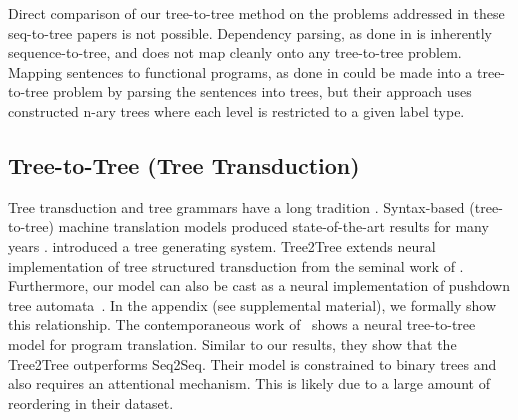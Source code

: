\documentclass{article}
\begin{document}




Direct comparison of our tree-to-tree method on the problems addressed in these seq-to-tree papers is not possible. Dependency parsing, as done in \citet{Zhang2015-bg} is inherently sequence-to-tree, and does not map cleanly onto any tree-to-tree problem.
Mapping sentences to functional programs, as done in \citep{alvarez2017tree,Dong2016-qq} could be made into a tree-to-tree problem by parsing the sentences into trees, but their approach uses constructed n-ary trees where each level is restricted to a given label type.



\subsection{Tree-to-Tree (Tree Transduction)}
Tree transduction and tree grammars have a long tradition  \citep{engelfriet1975bottom,joshi1975tree,graehl2008training,cowan2008tree}. Syntax-based (tree-to-tree) machine translation models produced state-of-the-art results for many years \citep{cowan2008tree,razmara2011application}. \citet{joshi1975tree} introduced a tree generating system. Tree2Tree extends neural implementation of tree structured transduction from the seminal work of \citet{frasconi1998general}. Furthermore, our model can also be cast as a neural implementation of  pushdown tree automata~\citep{schimpf1985tree}. In the appendix (see supplemental material), we formally show this relationship. The contemporaneous work of~\citet{chen2018tree} shows a neural tree-to-tree model for program translation. Similar to our results, they show that the Tree2Tree outperforms Seq2Seq. Their model is constrained to binary trees and also requires an attentional mechanism. This is likely due to a large amount of reordering in their dataset.

\end{document}
